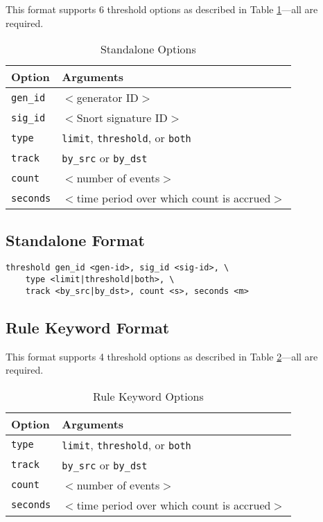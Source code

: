 \documentclass[english]{report}
\begin{document}
This format supports 6 threshold options as described in Table \ref{standalone_options}---all are required.

\begin{table}[!htbp]
\caption{Standalone Options\label{standalone_options}}
\begin{center}\begin{tabular}{| l | p{3.5in} |}
\hline
\textbf{Option} & \textbf{Arguments}\\
\hline
\hline
\texttt{gen\_id} & $<$generator ID$>$\\
\hline
\texttt{sig\_id} & $<$Snort signature ID$>$ \\
\hline
\texttt{type} & \texttt{limit}, \texttt{threshold}, or \texttt{both} \\
\hline
\texttt{track} & \texttt{by\_src} or \texttt{by\_dst} \\
\hline
\texttt{count} & $<$number of events$>$ \\
\hline
\texttt{seconds} & $<$time period over which count is accrued$>$ \\
\hline
\end{tabular}\end{center}
\end{table}

\subsection{Standalone Format}
\begin{verbatim}
threshold gen_id <gen-id>, sig_id <sig-id>, \
    type <limit|threshold|both>, \
    track <by_src|by_dst>, count <s>, seconds <m>  
\end{verbatim}


\subsection{Rule Keyword Format}

This format supports 4 threshold options as described in Table \ref{rule_keyword_options}---all are required.

\begin{table}[!hbpt]
\caption{Rule Keyword Options\label{rule_keyword_options}}
\begin{center}\begin{tabular}{| l | p{3.5in} |}
\hline
\textbf{Option} & \textbf{Arguments}\\
\hline
\hline
\texttt{type} & \texttt{limit}, \texttt{threshold}, or \texttt{both} \\
\hline
\texttt{track} & \texttt{by\_src} or \texttt{by\_dst} \\
\hline
\texttt{count} & $<$number of events$>$ \\
\hline
\texttt{seconds} & $<$time period over which count is accrued$>$ \\
\hline
\end{tabular}\end{center}
\end{table}
\end{document}
